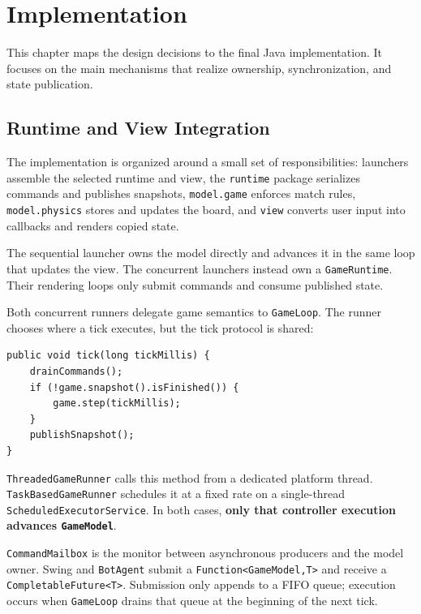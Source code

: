 \clearpage
\section{Implementation}

This chapter maps the design decisions to the final Java implementation. It
focuses on the main mechanisms that realize ownership, synchronization, and
state publication.

\subsection{Runtime and View Integration}

The implementation is organized around a small set of responsibilities:
launchers assemble the selected runtime and view, the \texttt{runtime} package
serializes commands and publishes snapshots, \texttt{model.game} enforces
match rules, \texttt{model.physics} stores and updates the board, and
\texttt{view} converts user input into callbacks and renders copied state.

The sequential launcher owns the model directly and advances it in the same
loop that updates the view. The concurrent launchers instead own a
\texttt{GameRuntime}. Their rendering loops only submit commands and consume
published state.

Both concurrent runners delegate game semantics to \texttt{GameLoop}. The
runner chooses where a tick executes, but the tick protocol is shared:

\begin{lstlisting}[style=codestyle,caption={Shared single-writer controller tick, from \texttt{runtime.GameLoop}},label={lst:shared-game-loop}]
public void tick(long tickMillis) {
    drainCommands();
    if (!game.snapshot().isFinished()) {
        game.step(tickMillis);
    }
    publishSnapshot();
}
\end{lstlisting}

\texttt{ThreadedGameRunner} calls this method from a dedicated platform
thread. \texttt{TaskBasedGameRunner} schedules it at a fixed rate on a
single-thread \texttt{ScheduledExecutorService}. In both cases,
\textbf{only that controller execution advances \texttt{GameModel}}.

\texttt{CommandMailbox} is the monitor between asynchronous producers and the
model owner. Swing and \texttt{BotAgent} submit a
\texttt{Function<GameModel,T>} and receive a \texttt{CompletableFuture<T>}.
Submission only appends to a FIFO queue; execution occurs when
\texttt{GameLoop} drains that queue at the beginning of the next tick.

